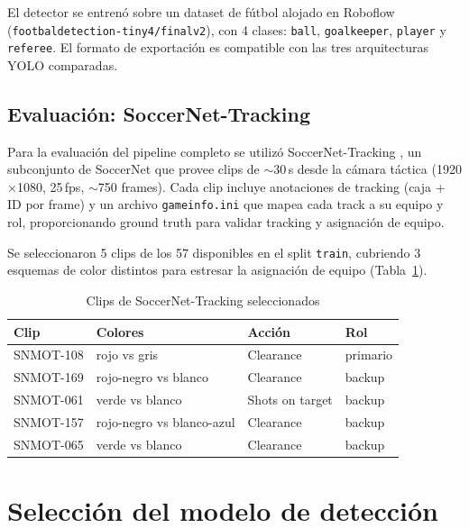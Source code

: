 \documentclass[conference]{IEEEtran}
\begin{document}
El detector se entrenó sobre un dataset de fútbol alojado en Roboflow
(\texttt{footbaldetection-tiny4/finalv2}), con 4 clases: \texttt{ball},
\texttt{goalkeeper}, \texttt{player} y \texttt{referee}. El formato de
exportación es compatible con las tres arquitecturas YOLO comparadas.

\subsection{Evaluación: SoccerNet-Tracking}

Para la evaluación del pipeline completo se utilizó SoccerNet-Tracking
\cite{b_soccernet}, un subconjunto de SoccerNet que provee clips de
$\sim$30\,s desde la cámara táctica (1920$\times$1080, 25\,fps, $\sim$750
frames). Cada clip incluye anotaciones de tracking (caja + ID por frame) y
un archivo \texttt{gameinfo.ini} que mapea cada track a su equipo y rol,
proporcionando ground truth para validar tracking y asignación de equipo.

Se seleccionaron 5 clips de los 57 disponibles en el split \texttt{train},
cubriendo 3 esquemas de color distintos para estresar la asignación de
equipo (Tabla~\ref{tab:clips}).

\begin{table}[htbp]
\caption{Clips de SoccerNet-Tracking seleccionados}
\begin{center}
\begin{tabular}{llll}
\toprule
\textbf{Clip} & \textbf{Colores} & \textbf{Acción} & \textbf{Rol} \\
\midrule
SNMOT-108 & rojo vs gris & Clearance & primario \\
SNMOT-169 & rojo-negro vs blanco & Clearance & backup \\
SNMOT-061 & verde vs blanco & Shots on target & backup \\
SNMOT-157 & rojo-negro vs blanco-azul & Clearance & backup \\
SNMOT-065 & verde vs blanco & Clearance & backup \\
\bottomrule
\end{tabular}
\label{tab:clips}
\end{center}
\end{table}

\section{Selección del modelo de detección}
\label{sec:modelo}
\end{document}
